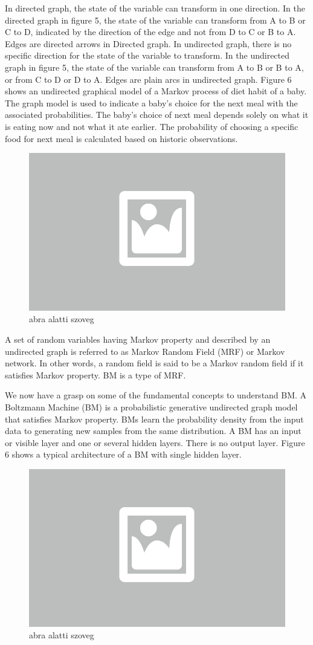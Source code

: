 In directed graph, the state of the variable can transform in one direction. In the directed graph in figure 5, the state of the variable can transform from A to B or C to D, indicated by the direction of the edge and not from D to C or B to A. Edges are directed arrows in Directed graph. In undirected graph, there is no specific direction for the state of the variable to transform. In the undirected graph in figure 5, the state of the variable can transform from A to B or B to A, or from C to D or D to A. Edges are plain arcs in undirected graph. Figure 6 shows an undirected graphical model of a Markov process of diet habit of a baby. The graph model is used to indicate a baby’s choice for the next meal with the associated probabilities. The baby’s choice of next meal depends solely on what it is eating now and not what it ate earlier. The probability of choosing a specific food for next meal is calculated based on historic observations.

\begin{figure}[ht]
	\centering
	\includegraphics[width=0.65\columnwidth]{figures/abra.png}
	\caption{abra alatti szoveg}
\end{figure}

A set of random variables having Markov property and described by an undirected graph is referred to as Markov Random Field (MRF) or Markov network. In other words, a random field is said to be a Markov random field if it satisfies Markov property. BM is a type of MRF.

We now have a grasp on some of the fundamental concepts to understand BM. A Boltzmann Machine (BM) is a probabilistic generative undirected graph model that satisfies Markov property. BMs learn the probability density from the input data to generating new samples from the same distribution.  A BM has an input or visible layer and one or several hidden layers. There is no output layer. Figure 6 shows a typical architecture of a BM with single hidden layer. 

\begin{figure}[ht]
	\centering
	\includegraphics[width=0.65\columnwidth]{figures/abra.png}
	\caption{abra alatti szoveg}
\end{figure}

